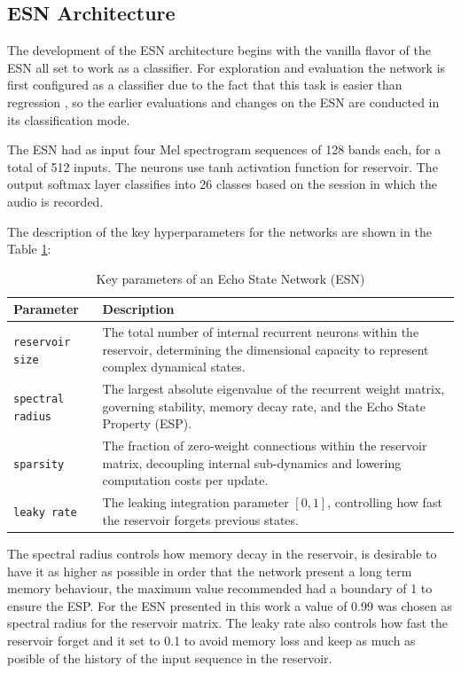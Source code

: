 \subsection{ESN Architecture}

The development of the ESN architecture begins with the vanilla flavor of the ESN all set to work as a classifier. For exploration and evaluation the network is first configured as a classifier due to the fact that this task is easier than regression \cite{vapnikstatistical}, so the earlier evaluations and changes on the ESN are conducted in its classification mode.

The ESN had as input four Mel spectrogram sequences of 128 bands each, for a total of 512 inputs. The neurons use tanh activation function for reservoir. The output softmax layer classifies into 26 classes based on the session in which the audio is recorded.

The description of the key hyperparameters for the networks are shown in the Table \ref{tab:esn_parameters}:

\begin{table}[htbp]
\centering
\caption{Key parameters of an Echo State Network (ESN)}
\label{tab:esn_parameters}
\begin{tabular}{lp{10cm}}
\hline
\textbf{Parameter} & \textbf{Description} \\
\hline
\texttt{reservoir size} & The total number of internal recurrent neurons within the reservoir, determining the dimensional capacity to represent complex dynamical states. \\
\texttt{spectral radius} & The largest absolute eigenvalue of the recurrent weight matrix, governing stability, memory decay rate, and the Echo State Property (ESP). \\
\texttt{sparsity} & The fraction of zero-weight connections within the reservoir matrix, decoupling internal sub-dynamics and lowering computation costs per update. \\
\texttt{leaky rate} & The leaking integration parameter $[0, 1]$, controlling how fast the reservoir forgets previous states. \\
\hline
\end{tabular}
\end{table}

The spectral radius controls how memory decay in the reservoir, is desirable to have it as higher as possible in order that the network present a long term memory behaviour, the maximum value recommended had a boundary of 1 to ensure the ESP. For the ESN presented in this work a value of 0.99 was chosen as spectral radius for the reservoir matrix. The leaky rate also controls how fast the reservoir forget and it set to 0.1 to avoid memory loss and keep as much as posible of the history of the input sequence in the reservoir.

